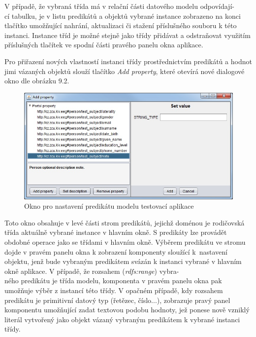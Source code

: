 \documentclass{projekt}
\begin{document}
V případě, že vybraná třída má v relační části datového modelu odpovídají-\\cí tabulku, je v listu predikátů a objektů vybrané instance zobrazeno na konci tlačítko umožňující nahrání, aktualizaci či stažení příslušného souboru k této instanci. 
Instance tříd je možné stejně jako třídy přidávat a odstraňovat využitím příslušných tlačítek ve spodní části pravého panelu okna aplikace.


Pro přiřazení nových vlastností instanci třídy prostřednictvím predikátů a hodnot jimi vázaných objektů slouží tlačítko {\it Add property}, které otevírá nové dialogové okno dle obrázku 9.2.


\begin{figure}[htb]
\begin{center}
\includegraphics[scale=0.65]{propertyFrame.jpg}
\caption{Okno pro nastavení predikátu modelu testovací aplikace}
\end{center}
\end{figure}

Toto okno obsahuje v levé části strom predikátů, jejichž doménou je rodičovská třída aktuálně vybrané instance v hlavním okně. S predikáty lze provádět obdobné operace jako se třídami v hlavním okně. Výběrem predikátu ve stromu dojde v pravém panelu okna k zobrazení komponenty sloužící k~nastavení objektu, jenž bude vybraným predikátem svázán k instanci vybrané v hlavním okně aplikace. V případě, že rozsahem ({\it rdfs:range}) vybra-\\ného predikátu je třída modelu, komponenta v pravém panelu okna pak umožňuje výběr z instancí této třídy. V opačném případě, kdy rozsahem predikátu je primitivní datový typ (řetězec, číslo...), zobrazuje pravý panel komponentu umožňující zadat textovou podobu hodnoty, jež ponese nově vzniklý literál vytvořený jako objekt vázaný vybraným predikátem k vybrané instanci třídy. 
\end{document}
